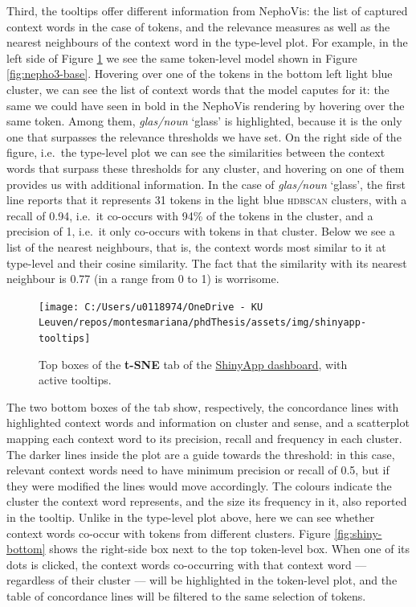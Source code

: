 \documentclass[
]{book}
\begin{document}
Third, the tooltips offer different information from NephoVis: the list of captured context words in the case of tokens, and the relevance measures as well as the nearest neighbours of the context word in the type-level plot. For example, in the left side of Figure \ref{fig:shiny-tooltips} we see the same token-level model shown in Figure \ref{fig:nepho3-base}. Hovering over one of the tokens in the bottom left light blue cluster, we can see the list of context words that the model caputes for it: the same we could have seen in bold in the NephoVis rendering by hovering over the same token. Among them, \emph{glas/noun} `glass' is highlighted, because it is the only one that surpasses the relevance thresholds we have set. On the right side of the figure, i.e.~the type-level plot we can see the similarities between the context words that surpass these thresholds for any cluster, and hovering on one of them provides us with additional information. In the case of \emph{glas/noun} `glass', the first line reports that it represents 31 tokens in the light blue \textsc{hdbscan} clusters, with a recall of 0.94, i.e.~it co-occurs with 94\% of the tokens in the cluster, and a precision of 1, i.e.~it only co-occurs with tokens in that cluster. Below we see a list of the nearest neighbours, that is, the context words most similar to it at type-level and their cosine similarity. The fact that the similarity with its nearest neighbour is 0.77 (in a range from 0 to 1) is worrisome.



\begin{figure}
\texttt{[image: C:/Users/u0118974/OneDrive - KU Leuven/repos/montesmariana/phdThesis/assets/img/shinyapp-tooltips]} \caption{Top boxes of the \textbf{t-SNE} tab of the \href{https://marianamontes.shinyapps.io/Level3/}{ShinyApp dashboard}, with active tooltips.}\label{fig:shiny-tooltips}
\end{figure}

The two bottom boxes of the tab show, respectively, the concordance lines with highlighted context words and information on cluster and sense, and a scatterplot mapping each context word to its precision, recall and frequency in each cluster. The darker lines inside the plot are a guide towards the threshold: in this case, relevant context words need to have minimum precision or recall of 0.5, but if they were modified the lines would move accordingly. The colours indicate the cluster the context word represents, and the size its frequency in it, also reported in the tooltip. Unlike in the type-level plot above, here we can see whether context words co-occur with tokens from different clusters. Figure \ref{fig:shiny-bottom} shows the right-side box next to the top token-level box. When one of its dots is clicked, the context words co-occurring with that context word --- regardless of their cluster --- will be highlighted in the token-level plot, and the table of concordance lines will be filtered to the same selection of tokens.
\end{document}
